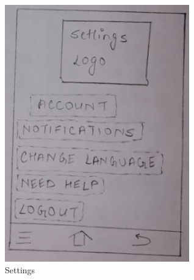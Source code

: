 \documentclass[acmtog]{acmart}
\begin{document}
\begin{figure}[H]
    \includegraphics[width=8cm]{Resources/Settings.jpg}
    \caption{Settings}
    \label{fig:settings}
\end{figure}

\clearpage
\end{document}
